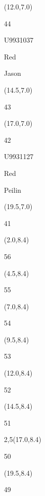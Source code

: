 \documentclass[a4paper]{article}
\newcommand{\myseat}[4]{%
\vspace{-0.1cm} \hspace{-0.5cm}
\parbox[t][2.2cm][t]{3.5cm}{%
\small #1 %
\begin{description}
\vspace{-0.1cm}
\item [ID:] #2
\vspace{-0.1cm}
\item [Team:] #3 \normalsize
\vspace{-0.1cm}
\item \normalsize #4
\vspace{-0.1cm}
\end{description}
}
}
\begin{document}
\begin{textblock}{2.5}(12.0,7.0)
\myseat{44}{U9931037}{Red}{Jason}
\end{textblock}

\begin{textblock}{2.5}(14.5,7.0)
\textblockcolor{}
\myseat{43}{}{}{}
\end{textblock}

\begin{textblock}{2.5}(17.0,7.0)
\myseat{42}{U9931127}{Red}{Peilin}
\end{textblock}

\begin{textblock}{2.5}(19.5,7.0)
\textblockcolor{}
\myseat{41}{}{}{}
\end{textblock}


\begin{textblock}{2.5}(2.0,8.4)
\textblockcolor{}
\myseat{56}{}{}{}
\end{textblock}

\begin{textblock}{2.5}(4.5,8.4)
\textblockcolor{}
\myseat{55}{}{}{}
\end{textblock}

\begin{textblock}{2.5}(7.0,8.4)
\textblockcolor{}
\myseat{54}{}{}{}
\end{textblock}

\begin{textblock}{2.5}(9.5,8.4)
\textblockcolor{}
\myseat{53}{}{}{}
\end{textblock}

\begin{textblock}{2.5}(12.0,8.4)
\textblockcolor{}
\myseat{52}{}{}{}
\end{textblock}

\begin{textblock}{2.5}(14.5,8.4)
\textblockcolor{}
\myseat{51}{}{}{}
\end{textblock}

\begin{textblock}{2,5}(17.0,8.4)
\textblockcolor{}
\myseat{50}{}{}{}
\end{textblock}

\begin{textblock}{2.5}(19.5,8.4)
\textblockcolor{}
\myseat{49}{}{}{}
\end{textblock}
\end{document}
